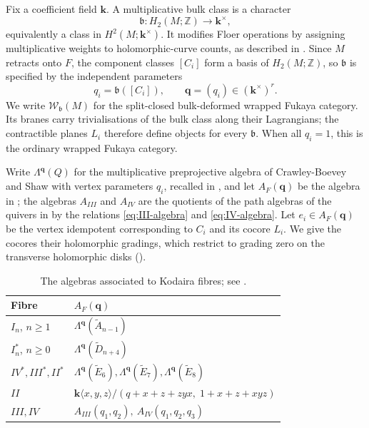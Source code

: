 \documentclass[a4paper]{amsart}
\newcommand{\kk}{\mathbf{k}}
\newcommand{\ZZ}{\mathbb{Z}}
\numberwithin{equation}{section}
\begin{document}
Fix a coefficient field $\kk$. A multiplicative bulk class is a character
\[
 \mathfrak b:H_2(M;\ZZ)\longrightarrow\kk^\times,
\]
equivalently a class in $H^2(M;\kk^\times)$. It modifies Floer operations
by assigning multiplicative weights to holomorphic-curve counts, as
described in . Since $M$ retracts onto $F$, the
component classes $[C_i]$ form a basis of $H_2(M;\ZZ)$, so
$\mathfrak b$ is specified by the independent parameters
\[
 q_i=\mathfrak b([C_i]),\qquad
 \boldsymbol q=(q_i)\in(\kk^\times)^r.
\]
We write $\mathcal W_{\mathfrak b}(M)$ for the split-closed bulk-deformed
wrapped Fukaya category. Its branes carry trivialisations of the bulk
class along their Lagrangians; the contractible planes $L_i$ therefore
define objects for every $\mathfrak b$. When all $q_i=1$, this is the
ordinary wrapped Fukaya category.

Write $\Lambda^{\boldsymbol q}(Q)$ for the multiplicative preprojective
algebra of Crawley-Boevey and Shaw \cite{CBShaw} with vertex parameters
$q_i$, recalled in , and let $A_F(\boldsymbol q)$
be the algebra in ; the algebras $A_{III}$ and
$A_{IV}$ are the quotients of the path algebras of the quivers in
 by the relations \eqref{eq:III-algebra}
and \eqref{eq:IV-algebra}.
Let $e_i\in A_F(\boldsymbol q)$ be the vertex idempotent corresponding
to $C_i$ and its cocore $L_i$. We give the cocores their holomorphic
gradings, which restrict to grading zero on the transverse holomorphic
disks ().

\begin{table}[ht]
\centering
\begin{tabular}{@{}ll@{}}
\toprule
Fibre & $A_F(\boldsymbol q)$\\
\midrule
$I_n$, $n\ge1$ & $\Lambda^{\boldsymbol q}(\widetilde A_{n-1})$\\
$I_n^*$, $n\ge0$ & $\Lambda^{\boldsymbol q}(\widetilde D_{n+4})$\\
$IV^*,III^*,II^*$ &
 $\Lambda^{\boldsymbol q}(\widetilde E_6),
  \Lambda^{\boldsymbol q}(\widetilde E_7),
  \Lambda^{\boldsymbol q}(\widetilde E_8)$\\
$II$ & $\kk\langle x,y,z\rangle/(q+x+z+zyx,\;1+x+z+xyz)$\\
$III,IV$ & $A_{III}(q_1,q_2),\ A_{IV}(q_1,q_2,q_3)$\\
\bottomrule
\end{tabular}
\par\vspace{6pt}
\caption{The algebras associated to Kodaira fibres; see
.}
\label{tab:algebras}
\end{table}
\end{document}
